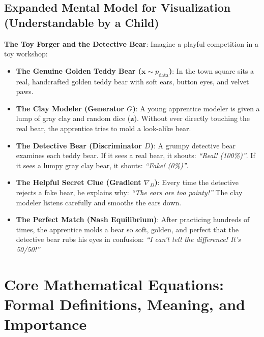 \documentclass[11pt,a4paper]{article}
\theoremstyle{definition}
\begin{document}
\subsection{Expanded Mental Model for Visualization (Understandable by a Child)}
\textbf{The Toy Forger and the Detective Bear}:
Imagine a playful competition in a toy workshop:
\begin{itemize}
    \item \textbf{The Genuine Golden Teddy Bear ($\mathbf{x} \sim p_{\text{data}}$)}:
    In the town square sits a real, handcrafted golden teddy bear with soft ears, button eyes, and velvet paws.
    
    \item \textbf{The Clay Modeler (Generator $G$)}:
    A young apprentice modeler is given a lump of gray clay and random dice ($\mathbf{z}$). Without ever directly touching the real bear, the apprentice tries to mold a look-alike bear.
    
    \item \textbf{The Detective Bear (Discriminator $D$)}:
    A grumpy detective bear examines each teddy bear. If it sees a real bear, it shouts: \emph{``Real! (100\%)''}. If it sees a lumpy gray clay bear, it shouts: \emph{``Fake! (0\%)''}.
    
    \item \textbf{The Helpful Secret Clue (Gradient $\nabla_D$)}:
    Every time the detective rejects a fake bear, he explains why: \emph{``The ears are too pointy!''} The clay modeler listens carefully and smooths the ears down.
    
    \item \textbf{The Perfect Match (Nash Equilibrium)}:
    After practicing hundreds of times, the apprentice molds a bear so soft, golden, and perfect that the detective bear rubs his eyes in confusion: \emph{``I can't tell the difference! It's 50/50!''}
\end{itemize}

\section{Core Mathematical Equations: Formal Definitions, Meaning, and Importance}
\end{document}
